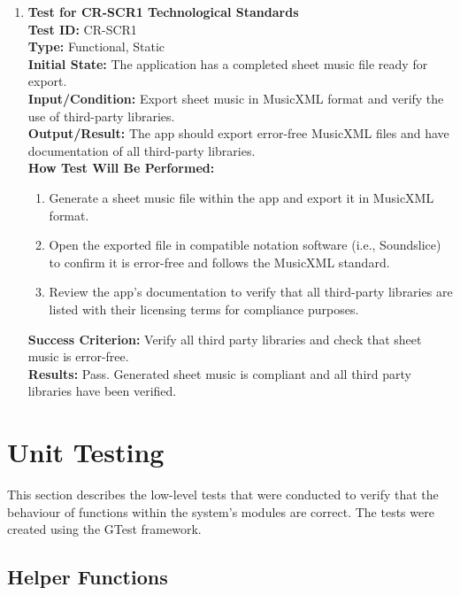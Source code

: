 \documentclass[12pt, titlepage]{article}
\begin{document}
\begin{enumerate}
    \item \textbf{Test for CR-SCR1 Technological Standards} \\
      \newline
      \textbf{Test ID:} CR-SCR1 \\
      \textbf{Type:} Functional, Static \\
      \textbf{Initial State:} The application has a completed sheet music file ready for export. \\
      \textbf{Input/Condition:} Export sheet music in MusicXML format and verify the use of third-party libraries. \\
      \textbf{Output/Result:} The app should export error-free MusicXML files and have documentation of all third-party libraries. \\
      \textbf{How Test Will Be Performed:}
      \begin{enumerate}
          \item Generate a sheet music file within the app and export it in MusicXML format.
          \item Open the exported file in compatible notation software (i.e., Soundslice) to confirm it is error-free and follows the 
          MusicXML standard.
          \item Review the app’s documentation to verify that all third-party libraries are listed with their licensing 
          terms for compliance purposes.
      \end{enumerate}
      \textbf{Success Criterion:} Verify all third party libraries and check that sheet music is error-free.\\
      \textbf{Results:} Pass. Generated sheet music is compliant and all third party libraries have been verified.\\
\end{enumerate}
	
\section{Unit Testing}

This section describes the low-level tests that were conducted to verify that the behaviour of 
functions within the system's modules are correct. The tests were created using the GTest framework.

\subsection{Helper Functions}
\end{document}
